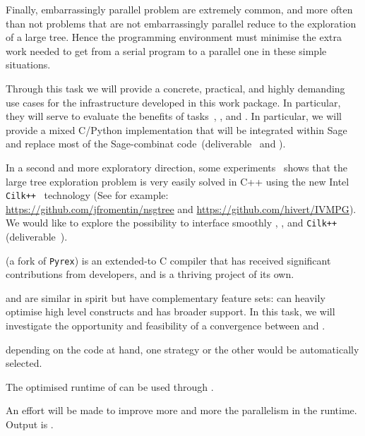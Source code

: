 \begin{workpackage}
\begin{tasklist}
\begin{task}[title=HPC infrastructure for combinatorics,id=hpc-combi,PM=26,lead=PS,partners={UB},wphases={0-6!0.3,12-36!0.5}]
  Finally, embarrassingly parallel problem are extremely common, and
  more often than not problems that are not embarrassingly parallel
  reduce to the exploration of a large tree. Hence the programming
  environment must minimise the extra work needed to get from a serial
  program to a parallel one in these simple situations.

  Through this task we will provide a concrete, practical, and highly
  demanding use cases for the infrastructure developed in this work
  package. In particular, they will serve to evaluate the benefits of
  tasks~,
  , and
  .
  In particular, we will provide a mixed C/Python implementation that
  will be integrated within Sage and replace most of the Sage-combinat
  code~(deliverable~ 
  and ).

  In a second and more exploratory direction, some
  experiments~\cite{FromentinHivert} shows that the large tree exploration
  problem is very easily solved in C++ using the new Intel
  \texttt{Cilk++}~\cite{CilkIntel,CilkRefman} technology (See for example:\\
  \href{https://github.com/jfromentin/nsgtree}{https://github.com/jfromentin/nsgtree}
  and
  \href{https://github.com/hivert/IVMPG}{https://github.com/hivert/IVMPG}). We
  would like to explore the possibility to interface smoothly \Pythran,
  \Cython, and \texttt{Cilk++} (deliverable~).
\end{task}

\begin{task}[title=Pythran,id=pythran,lead=LL,partners={UJF},PM=24, wphases=0-24]
  \Cython (a fork of \texttt{Pyrex}) is an extended-\Python to C
  compiler that has received significant contributions from \Sage
  developers, and is a thriving project of its own.

  \Pythran and \Cython are similar in spirit but have complementary feature
  sets: \Pythran can heavily optimise high level \Numpy constructs and \Cython
  has broader \Python support. In this task, we will investigate the
  opportunity and feasibility of a convergence between \Cython and \Pythran.
  \begin{compactitem}
    \item depending on the code at hand, one strategy or the other would be automatically selected.
    \item The optimised runtime of \Pythran can be used through \Cython.
  \end{compactitem}
  An effort will be made to improve more and more the parallelism in the
  \Pythran runtime. Output is .


\end{task}
\end{tasklist}
\end{workpackage}
